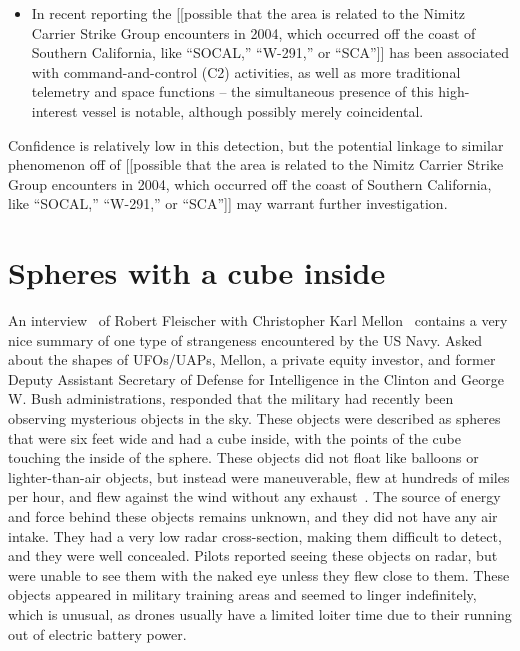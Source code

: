 \begin{svgraybox}
\begin{itemize}
\item In recent reporting  the
[[possible that the area is related to the Nimitz Carrier Strike Group encounters in 2004, which occurred off the coast of Southern California, like ``SOCAL,'' ``W-291,'' or ``SCA'']]
has been associated with command-and-control (C2) activities, as well as more traditional telemetry and space functions --
the simultaneous presence of this high-interest vessel is notable, although possibly merely coincidental.
\end{itemize}
Confidence is relatively low in this detection, but the potential linkage to similar phenomenon off of
[[possible that the area is related to the Nimitz Carrier Strike Group encounters in 2004, which occurred off the coast of Southern California, like ``SOCAL,'' ``W-291,'' or ``SCA'']]
may warrant further investigation.
\end{svgraybox}


\section{Spheres with a cube inside}

An interview~\cite{ExoMagazinTV2022Oct} of Robert Fleischer with Christopher Karl Mellon~ contains a very nice summary of one type of strangeness encountered by the US Navy. Asked about the shapes of UFOs/UAPs, Mellon, a private equity investor, and former Deputy Assistant Secretary of Defense for Intelligence in the Clinton and George W. Bush administrations, responded that the military had recently been observing mysterious objects in the sky. These objects were described as spheres that were six feet wide and had a cube inside, with the points of the cube touching the inside of the sphere. These objects did not float like balloons or lighter-than-air objects,
but instead were maneuverable, flew at hundreds of miles per hour, and flew against the wind without any exhaust~\cite{Graves_2023_OS_HOC}.
The source of energy and force behind these objects remains unknown, and they did not have any air intake. They had a very low radar cross-section, making them difficult to detect, and they were well concealed. Pilots reported seeing these objects on radar, but were unable to see them with the naked eye unless they flew close to them. These objects appeared in military training areas and seemed to linger indefinitely, which is unusual, as drones usually have a limited loiter time due to their running out of electric battery power.
